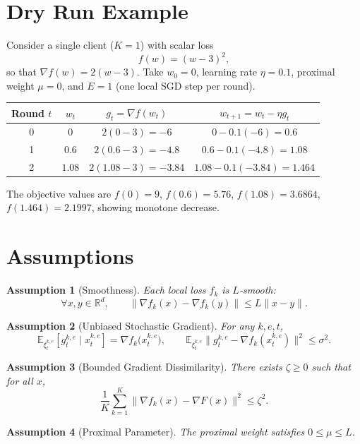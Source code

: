 \documentclass{article}
\newtheorem{assumption}{Assumption}
\newcommand{\E}{\mathbb{E}}
\newcommand{\R}{\mathbb{R}}
\begin{document}
\section*{Dry Run Example}
Consider a single client ($K=1$) with scalar loss
\[
f(w)=(w-3)^2,
\]
so that $\nabla f(w)=2(w-3)$.  
Take $w_0=0$, learning rate $\eta=0.1$, proximal weight $\mu=0$, and $E=1$ (one local SGD step per round).

\begin{center}
\begin{tabular}{c|c|c|c}
Round $t$ & $w_t$ & $g_t=\nabla f(w_t)$ & $w_{t+1}=w_t-\eta g_t$\\ \hline
0 & $0$ & $2(0-3)=-6$ & $0-0.1(-6)=0.6$\\
1 & $0.6$ & $2(0.6-3)=-4.8$ & $0.6-0.1(-4.8)=1.08$\\
2 & $1.08$ & $2(1.08-3)=-3.84$ & $1.08-0.1(-3.84)=1.464$\\
\end{tabular}
\end{center}
The objective values are $f(0)=9$, $f(0.6)=5.76$, $f(1.08)=3.6864$, $f(1.464)=2.1997$, showing monotone decrease.

\section*{Assumptions}
\begin{assumption}[Smoothness]\label{as:smooth}
Each local loss $f_k$ is $L$‑smooth:
\[
\forall x,y\in\R^d,\qquad 
\|\nabla f_k(x)-\nabla f_k(y)\|\le L\|x-y\|.
\]
\end{assumption}
\begin{assumption}[Unbiased Stochastic Gradient]\label{as:unbiased}
For any $k,e,t$,
\[
\E_{\xi_{t}^{k,e}}\!\left[g_{t}^{k,e}\mid x_{t}^{k,e}\right]
=\nabla f_k\bigl(x_{t}^{k,e}\bigr),
\qquad 
\E_{\xi_{t}^{k,e}}\!\bigl\|g_{t}^{k,e}
-\nabla f_k(x_{t}^{k,e})\bigr\|^{2}\le\sigma^{2}.
\]
\end{assumption}
\begin{assumption}[Bounded Gradient Dissimilarity]\label{as:hetero}
There exists $\zeta\ge0$ such that for all $x$,
\[
\frac1K\sum_{k=1}^{K}\bigl\|\nabla f_k(x)-\nabla F(x)\bigr\|^{2}\le\zeta^{2}.
\]
\end{assumption}
\begin{assumption}[Proximal Parameter]\label{as:mu}
The proximal weight satisfies $0\le\mu\le L$.
\end{assumption}
\end{document}
